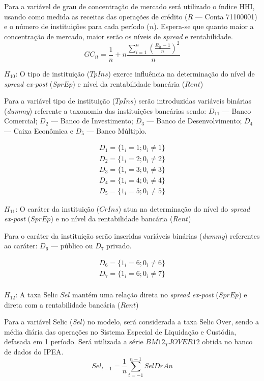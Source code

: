 \documentclass[12pt,12pt,openright,oneside,a4paper,chapter=TITLE,section=TITLE,subsection=TITLE,subsubsection=TITLE,english,french,spanish,portugues,sumario=tradicional]{abntex2}
\begin{document}
Para a variável de grau de concentração de mercado será utilizado o índice HHI, usando como medida as receitas das operações de crédito (\(R\) --- Conta 71100001) e o número de instituições para cada período (\(n\)). Espera-se que quanto maior a concentração de mercado, maior serão os níveis de \emph{spread} e rentabilidade.
\[
GC_{it} = \frac{1}{n} + n\frac{\sum_{i=1}^{n}(\frac{R_{it} - 1}{n})^2}{n}
\]

\(H_{10}\): O tipo de instituição (\(TpIns\)) exerce influência na determinação do nível de \emph{spread ex-post} (\(SprEp\)) e nível da rentabilidade bancária (\(Rent\))

Para a variável tipo de instituição (\(TpIns\)) serão introduzidas variáveis binárias (\emph{dummy}) referente a taxonomia das instituições bancárias sendo: \(D_{11}\) --- Banco Comercial; \(D_{2}\) --- Banco de Investimento; \(D_{3}\) --- Banco de Desenvolvimento; \(D_{4}\) --- Caixa Econômica e \(D_{5}\) --- Banco Múltiplo.

\[\begin{aligned}
D_{1} = \lbrace 1_{i} = 1 ; 0_{i} \neq 1 \rbrace \\
D_{2} = \lbrace 1_{i} = 2 ; 0_{i} \neq 2 \rbrace \\
D_{3} = \lbrace 1_{i} = 3 ; 0_{i} \neq 3 \rbrace \\
D_{4} = \lbrace 1_{i} = 4 ; 0_{i} \neq 4 \rbrace \\
D_{5} = \lbrace 1_{i} = 5 ; 0_{i} \neq 5 \rbrace
\end{aligned}\]

\(H_{11}\): O caráter da instituição (\(CrIns\)) atua na determinação do nível do
\emph{spread ex-post} (\(SprEp\)) e no nível da rentabilidade bancária (\(Rent\))

Para o caráter da instituição serão inseridas variáveis binárias (\emph{dummy}) referentes ao caráter: \(D_{6}\) --- público ou \(D_{7}\) privado.

\[\begin{aligned}
D_{6} = \lbrace 1_{i} = 6 ; 0_{i} \neq 6 \rbrace \\
D_{7} = \lbrace 1_{i} = 6 ; 0_{i} \neq 7 \rbrace \\
\end{aligned}\]

\(H_{12}\): A taxa Selic \(Sel\) mantém uma relação direta no \emph{spread ex-post} (\(SprEp\)) e direta com a rentabilidade bancária (\(Rent\))

Para a variável Selic (\(Sel\)) no modelo, será considerada a taxa Selic Over, sendo a média diária das operações no Sistema Especial de Liquidação e Custódia, defasada em 1 período. Será utilizada a série \(BM12_TJOVER12\) obtida no banco de dados do IPEA.
\[
Sel_{t-1} = \frac{1}{n}\sum_{t=-1}^{n-1}SelDrAn
\]
\end{document}
